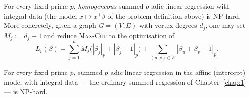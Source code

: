 
\begin{thm}
\label{thm:fixed-prime-hardness}
For every fixed prime \(p\), \emph{homogeneous} summed \(p\)-adic linear
regression with integral data (the model \(x\mapsto x^\top\beta\) of the
problem definition above) is NP-hard. More concretely, given a graph \(G=(V,E)\) with
vertex degrees \(d_j\), one may set \(M_j:=d_j+1\) and reduce \textsc{Max-Cut}
to the optimisation of
\[
L_p(\beta)
=
\sum_{j=1}^{n} M_j\bigl(|\beta_j|_p+|\beta_j-1|_p\bigr)
+
\sum_{(u,v)\in E} |\beta_u+\beta_v-1|_p.
\]
\end{thm}

\begin{corollary}
\label{cor:affine-hardness}
For every fixed prime \(p\), summed \(p\)-adic linear regression in the affine
(intercept) model with integral data --- the ordinary summed regression of
Chapter~\ref{chap:1} --- is NP-hard.
\end{corollary}
